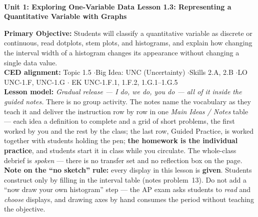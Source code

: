 \documentclass[10pt]{article}
\newcommand{\UnitNumberName}{Unit 1: Exploring One-Variable Data \quad}
\newcommand{\LessonNumberName}{Lesson 1.3: Representing a Quantitative Variable with Graphs}
\begin{document}
\begin{center}
    {\Large\bfseries \CourseName \\
    {\small\bfseries \UnitNumberName \LessonNumberName}}
\end{center}

\begin{tcolorbox}[colback=sky, colframe=navy, boxrule=0.9pt, arc=2mm,
    left=2mm, right=2mm, top=1.5mm, bottom=1.5mm]
    \textbf{Primary Objective:} Students will classify a quantitative variable as discrete or
    continuous, read dotplots, stem plots, and histograms, and explain how changing the interval
    width of a histogram changes its appearance without changing a single data value.
    \\[2pt]
    \textbf{CED alignment:} Topic 1.5 \quad$\cdot$\quad Big Idea: UNC (Uncertainty)
    \quad$\cdot$\quad Skills 2.A, 2.B \quad$\cdot$\quad LO UNC-1.F, UNC-1.G \quad$\cdot$\quad
    EK UNC-1.F.1, 1.F.2, 1.G.1--1.G.5
    \\[2pt]
    \textbf{Lesson model:} \emph{Gradual release --- I do, we do, you do --- all of it inside
    the guided notes.} There is no group activity. The notes name the vocabulary as they teach
    it and deliver the instruction row by row in one \emph{Main Ideas / Notes} table --- each
    idea a definition to complete and a grid of short problems, the first worked by you and the
    rest by the class; the last row, Guided Practice, is worked together with students holding
    the pen; \textbf{the homework is the individual practice}, and students
    start it in class while you circulate. The whole-class debrief is \emph{spoken} ---
    there is no transfer set and no reflection box on the page.
    \\[2pt]
    \textbf{Note on the ``no sketch'' rule:} every display in this lesson is \textbf{given}.
    Students construct only by filling in the interval table (notes problem~13). Do not add a
    ``now draw your own histogram'' step --- the AP exam asks students to \emph{read} and
    \emph{choose} displays, and drawing axes by hand consumes the period without teaching the
    objective.
\end{tcolorbox}
\end{document}
